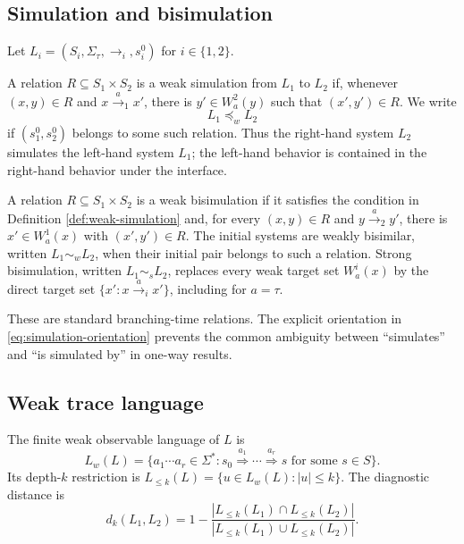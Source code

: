 \documentclass{ws-jbcb}
\numberwithin{equation}{section}
\newcommand{\TAU}{\tau}
\newcommand{\xRightarrow}[1]{\stackrel{#1}{\Longrightarrow}}
\newcommand{\strongsim}{\mathrel{\sim_{s}}}
\newcommand{\weaksim}{\mathrel{\sim_{w}}}
\newcommand{\weakpre}{\mathrel{\preceq_{w}}}
\begin{document}
\subsection{Simulation and bisimulation}\label{sec:relations}

Let $L_i=(S_i,\Sigma_{\TAU},\longrightarrow_i,s_i^0)$ for $i\in\{1,2\}$.

\begin{definition}\label{def:weak-simulation}
A relation $R\subseteq S_1\times S_2$ is a weak simulation from $L_1$ to $L_2$
if, whenever $(x,y)\in R$ and $x\xrightarrow{a}_1x'$, there is
$y'\in W_a^2(y)$ such that $(x',y')\in R$. We write
\begin{equation}\label{eq:simulation-orientation}
 L_1\weakpre L_2
\end{equation}
if $(s_1^0,s_2^0)$ belongs to some such relation. Thus the right-hand system
$L_2$ simulates the left-hand system $L_1$; the left-hand behavior is contained
in the right-hand behavior under the interface.
\end{definition}

\begin{definition}\label{def:bisimulation}
A relation $R\subseteq S_1\times S_2$ is a weak bisimulation if it satisfies the
condition in Definition \ref{def:weak-simulation} and, for every $(x,y)\in R$ and
$y\xrightarrow{a}_2y'$, there is $x'\in W_a^1(x)$ with $(x',y')\in R$. The
initial systems are weakly bisimilar, written $L_1\weaksim L_2$, when their
initial pair belongs to such a relation. Strong bisimulation, written
$L_1\strongsim L_2$, replaces every weak target set $W_a^i(x)$ by the direct
target set $\{x':x\xrightarrow{a}_i x'\}$, including for $a=\TAU$.
\end{definition}

These are standard branching-time relations.\cite{Milner1989,Sangiorgi2011}
The explicit orientation in \eqref{eq:simulation-orientation} prevents the common
ambiguity between ``simulates'' and ``is simulated by'' in one-way results.

\subsection{Weak trace language}\label{sec:trace-language}

\begin{definition}\label{def:weak-traces}
The finite weak observable language of $L$ is
\begin{equation}\label{eq:exact-language}
 L_w(L)=\{a_1\cdots a_r\in\Sigma^*:s_0
 \xRightarrow{a_1}\cdots\xRightarrow{a_r}s
 \text{ for some }s\in S\}.
\end{equation}
Its depth-$k$ restriction is
$L_{\leq k}(L)=\{u\in L_w(L):|u|\leq k\}$. The diagnostic distance is
\begin{equation}\label{eq:distance}
d_k(L_1,L_2)=1-
\frac{|L_{\leq k}(L_1)\cap L_{\leq k}(L_2)|}
{|L_{\leq k}(L_1)\cup L_{\leq k}(L_2)|}.
\end{equation}
\end{definition}
\end{document}

